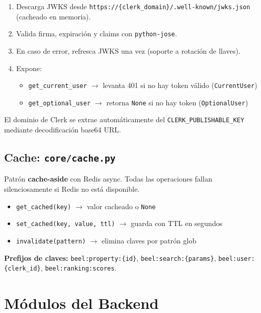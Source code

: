 \documentclass[12pt,a4paper]{report}
\begin{document}
\begin{enumerate}[leftmargin=*]
  \item Descarga JWKS desde \texttt{https://\{clerk\_domain\}/.well-known/jwks.json} (cacheado en memoria).
  \item Valida firma, expiraci\'on y claims con \texttt{python-jose}.
  \item En caso de error, refresca JWKS una vez (soporte a rotaci\'on de llaves).
  \item Expone:
  \begin{itemize}
    \item \texttt{get\_current\_user} $\rightarrow$ levanta 401 si no hay token v\'alido (\texttt{CurrentUser})
    \item \texttt{get\_optional\_user} $\rightarrow$ retorna \texttt{None} si no hay token (\texttt{OptionalUser})
  \end{itemize}
\end{enumerate}

El dominio de Clerk se extrae autom\'aticamente del \texttt{CLERK\_PUBLISHABLE\_KEY}
mediante decodificaci\'on base64 URL.

\section{Cache: \texttt{core/cache.py}}

Patr\'on \textbf{cache-aside} con Redis async. Todas las operaciones fallan silenciosamente
si Redis no est\'a disponible.

\begin{itemize}[leftmargin=*]
  \item \texttt{get\_cached(key)} $\rightarrow$ valor cacheado o \texttt{None}
  \item \texttt{set\_cached(key, value, ttl)} $\rightarrow$ guarda con TTL en segundos
  \item \texttt{invalidate(pattern)} $\rightarrow$ elimina claves por patr\'on glob
\end{itemize}

\textbf{Prefijos de claves:} \texttt{beel:property:\{id\}}, \texttt{beel:search:\{params\}},
\texttt{beel:user:\{clerk\_id\}}, \texttt{beel:ranking:scores}.

\chapter{M\'odulos del Backend}
\end{document}
